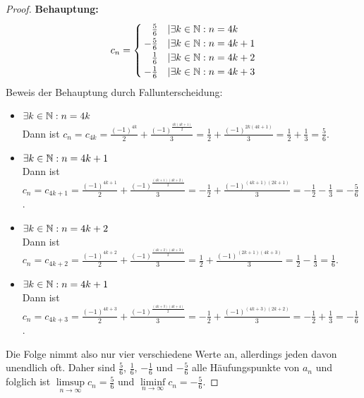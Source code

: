 \documentclass{article}
\begin{document}
\begin{enumerate}[(a)]
		\begin{proof}
			\textbf{Behauptung:}
			$$c_n = \begin{cases}
			\hfill \frac{5}{6} &| \exists k\in \N: n = 4k\\
			-\frac{5}{6} &| \exists k\in \N: n = 4k + 1\\
			\hfill\frac{1}{6} &| \exists k\in \N: n = 4k + 2\\
			-\frac{1}{6} &| \exists k\in \N: n = 4k + 3
			\end{cases}$$
			Beweis der Behauptung durch Fallunterscheidung:
			\begin{itemize}
				\item $\exists k\in \mathbb{N}: n = 4k$\\
				Dann ist $c_n = c_{4k} = \frac{(-1)^{4k}}{2} + \frac{(-1)^{\frac{4k(4k+1)}{2}}}{3} = \frac{1}{2} + \frac{(-1)^{2k(4k+1)}}{3} = \frac{1}{2} + \frac{1}{3} = \frac{5}{6}$.
				\item $\exists k\in \mathbb{N}: n = 4k + 1$\\
				Dann ist $c_n = c_{4k+1} = \frac{(-1)^{4k+1}}{2} + \frac{(-1)^{\frac{(4k+1)(4k+2)}{2}}}{3} = -\frac{1}{2} + \frac{(-1)^{(4k+1)(2k+1)}}{3} = -\frac{1}{2} - \frac{1}{3} = -\frac{5}{6}$.
				\item $\exists k\in \mathbb{N}: n = 4k + 2$\\
				Dann ist $c_n = c_{4k+2} = \frac{(-1)^{4k+2}}{2} + \frac{(-1)^{\frac{(4k+2)(4k+3)}{2}}}{3} = \frac{1}{2} + \frac{(-1)^{(2k+1)(4k+3)}}{3} = \frac{1}{2} - \frac{1}{3} = \frac{1}{6}$.
				\item $\exists k\in \mathbb{N}: n = 4k + 1$\\
				Dann ist $c_n = c_{4k+3} = \frac{(-1)^{4k+3}}{2} + \frac{(-1)^{\frac{(4k+3)(4k+4)}{2}}}{3} = -\frac{1}{2} + \frac{(-1)^{(4k+3)(2k+2)}}{3} = -\frac{1}{2} + \frac{1}{3} = -\frac{1}{6}$.
			\end{itemize}
		Die Folge nimmt also nur vier verschiedene Werte an, allerdings jeden davon unendlich oft. Daher sind $\frac{5}{6}$, $\frac{1}{6}$, $-\frac{1}{6}$ und $-\frac{5}{6}$ alle Häufungspunkte von $a_n$ und folglich ist $\limsup\limits_{n\to \infty} c_n = \frac{5}{6}$ und $\liminf\limits_{n\to \infty} c_n = -\frac{5}{6}$.
		\end{proof}
	\end{enumerate}
\end{document}
